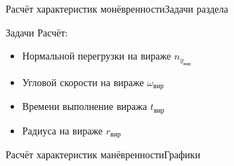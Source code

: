 \begin{frame}{Расчёт характеристик монёвренности}{Задачи раздела}
    \begin{block}{Задачи}
        Расчёт:
        \begin{itemize}
            \item Нормальной перегрузки на вираже $n_{y_\text{вир}}$
            \item Угловой скорости на вираже $\omega_\text{вир}$
            \item Времени выполнение виража $t_\text{вир}$
            \item Радиуса на вираже $r_\text{вир}$
        \end{itemize}
    \end{block}
\end{frame}

\begin{frame}{Расчёт характеристик манёвренности}{Графики}
    \begin{minipage}[c]{0.45\textwidth}
    \end{minipage}  
    \begin{minipage}[c]{0.45\textwidth}
    \end{minipage}
\end{frame}